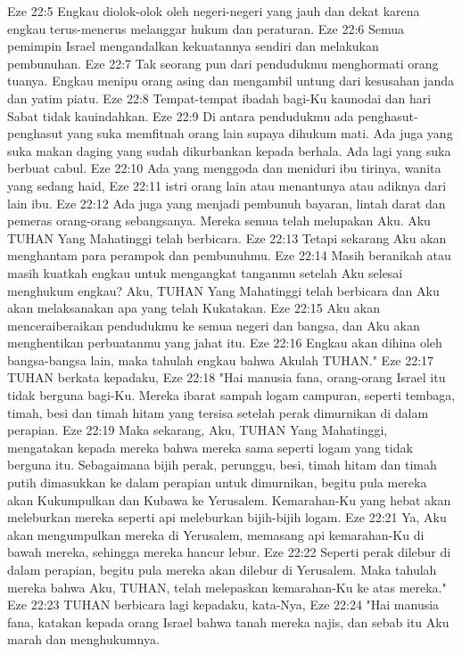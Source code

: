 Eze 22:5  Engkau diolok-olok oleh negeri-negeri yang jauh dan dekat karena engkau terus-menerus melanggar hukum dan peraturan.
Eze 22:6  Semua pemimpin Israel mengandalkan kekuatannya sendiri dan melakukan pembunuhan.
Eze 22:7  Tak seorang pun dari pendudukmu menghormati orang tuanya. Engkau menipu orang asing dan mengambil untung dari kesusahan janda dan yatim piatu.
Eze 22:8  Tempat-tempat ibadah bagi-Ku kaunodai dan hari Sabat tidak kauindahkan.
Eze 22:9  Di antara pendudukmu ada penghasut-penghasut yang suka memfitnah orang lain supaya dihukum mati. Ada juga yang suka makan daging yang sudah dikurbankan kepada berhala. Ada lagi yang suka berbuat cabul.
Eze 22:10  Ada yang menggoda dan meniduri ibu tirinya, wanita yang sedang haid,
Eze 22:11  istri orang lain atau menantunya atau adiknya dari lain ibu.
Eze 22:12  Ada juga yang menjadi pembunuh bayaran, lintah darat dan pemeras orang-orang sebangsanya. Mereka semua telah melupakan Aku. Aku TUHAN Yang Mahatinggi telah berbicara.
Eze 22:13  Tetapi sekarang Aku akan menghantam para perampok dan pembunuhmu.
Eze 22:14  Masih beranikah atau masih kuatkah engkau untuk mengangkat tanganmu setelah Aku selesai menghukum engkau? Aku, TUHAN Yang Mahatinggi telah berbicara dan Aku akan melaksanakan apa yang telah Kukatakan.
Eze 22:15  Aku akan menceraiberaikan pendudukmu ke semua negeri dan bangsa, dan Aku akan menghentikan perbuatanmu yang jahat itu.
Eze 22:16  Engkau akan dihina oleh bangsa-bangsa lain, maka tahulah engkau bahwa Akulah TUHAN."
Eze 22:17  TUHAN berkata kepadaku,
Eze 22:18  "Hai manusia fana, orang-orang Israel itu tidak berguna bagi-Ku. Mereka ibarat sampah logam campuran, seperti tembaga, timah, besi dan timah hitam yang tersisa setelah perak dimurnikan di dalam perapian.
Eze 22:19  Maka sekarang, Aku, TUHAN Yang Mahatinggi, mengatakan kepada mereka bahwa mereka sama seperti logam yang tidak berguna itu. Sebagaimana bijih perak, perunggu, besi, timah hitam dan timah putih dimasukkan ke dalam perapian untuk dimurnikan, begitu pula mereka akan Kukumpulkan dan Kubawa ke Yerusalem. Kemarahan-Ku yang hebat akan meleburkan mereka seperti api meleburkan bijih-bijih logam.
Eze 22:21  Ya, Aku akan mengumpulkan mereka di Yerusalem, memasang api kemarahan-Ku di bawah mereka, sehingga mereka hancur lebur.
Eze 22:22  Seperti perak dilebur di dalam perapian, begitu pula mereka akan dilebur di Yerusalem. Maka tahulah mereka bahwa Aku, TUHAN, telah melepaskan kemarahan-Ku ke atas mereka."
Eze 22:23  TUHAN berbicara lagi kepadaku, kata-Nya,
Eze 22:24  "Hai manusia fana, katakan kepada orang Israel bahwa tanah mereka najis, dan sebab itu Aku marah dan menghukumnya.
